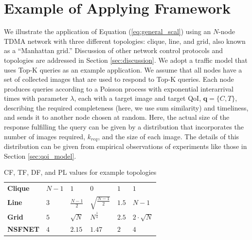\section{Example of Applying Framework}
\label{sec:example_applications}

We illustrate the application of Equation (\ref{eq:general_scal}) using an $N$-node TDMA network with three different topologies: clique, line, and grid, also known as a ``Manhattan grid.''  Discussion of other network control protocols and topologies are addressed in Section \ref{sec:discussion}.  We adopt a traffic model that uses Top-K queries as an example application.  We assume that all nodes have a set of collected images that are used to respond to Top-K queries.  Each node produces queries according to a Poisson process with exponential interarrival times with parameter $\lambda$, each with a target image and target QoI, $\mathbf{q} = \{C, T\}$, describing the required completeness (here, we use sum similarity) and timeliness, and sends it to another node chosen at random.  Here, the actual size of the response fulfilling the query can be given by a distribution that incorporates the number of images required, $k_{req}$, and the size of each image.  The details of this distribution can be given from empirical observations of experiments like those in Section \ref{sec:qoi_model}.

\begin{table}[]
\centering
\begin{tabular}{l|l|l|l|l|l|}
\cline{2-6}
                            					 & \boldmath{$CF$}  			& \boldmath{$\mu_{TF}$}   			& \boldmath{$\sigma_{TF}$}										& \boldmath{$DF$}			& \boldmath{$PL_{max}$}	\\ \hline
\multicolumn{1}{|l|}{\textbf{Clique}} 	& $N-1$ 						& $1$                            				& $0$                            												& $1$  						& $1$ 					\\ \hline
\multicolumn{1}{|l|}{\textbf{Line}}   	& $3$   							& $\frac{N-1}{2}$ 					& $\sqrt{\frac{N-1}{2}}$ 		& $1.5$						& $N-1$				\\ \hline
\multicolumn{1}{|l|}{\textbf{Grid}}   	& $5$   							& $\sqrt{N}$                       			&$N^{\frac{1}{4}}$							&  $2.5$					& $2 \cdot \sqrt{N}$   	\\ \hline
\multicolumn{1}{|l|}{\textbf{NSFNET}}  & $4$  & $2.15$  &$1.47$ &  $2$  & $4$  \\ \hline
\end{tabular}
\vspace{1mm}
\caption{CF, TF, DF, and PL values for example topologies}
\label{table:rf_ff_sf_values}
\end{table}

